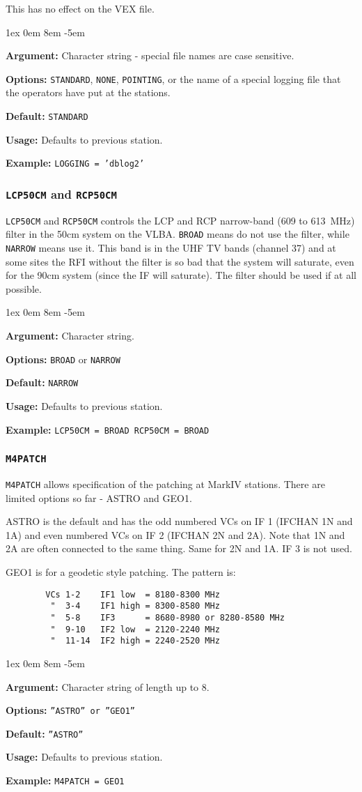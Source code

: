 \documentclass{report}
\newcommand{\rcwbox}[5]{
  \begin{list}{}{\parsep 1ex  \itemsep 0em
                 \leftmargin 8em  \itemindent -5em }
    \item {\bf Argument:} #1
    \item {\bf Options:}  #2
    \item {\bf Default:}  #3
    \item {\bf Usage:}    #4
    \item {\bf Example:}  #5
  \end{list}
}
\begin{document}
This has no effect on the VEX file.

\rcwbox
{Character string - special file names are case sensitive.}
{{\tt STANDARD}, {\tt NONE}, {\tt POINTING}, or the name of a special
logging file that the operators have put at the stations.}
{{\tt STANDARD}}
{Defaults to previous station.}
{{\tt LOGGING = 'dblog2'}}


\subsubsection{\label{SP:LCP50CM}{\tt LCP50CM} and {\tt RCP50CM}}

{\tt LCP50CM} and {\tt RCP50CM} controls the LCP and RCP narrow-band
(609 to 613~MHz) filter in the 50cm system on the VLBA. {\tt BROAD}
means do not use the filter, while {\tt NARROW} means use it. This
band is in the UHF TV bands (channel 37) and at some sites the RFI
without the filter is so bad that the system will saturate, even for
the 90cm system (since the IF will saturate). The filter should be
used if at all possible.

\rcwbox
{Character string.}
{{\tt BROAD} or {\tt NARROW}}
{{\tt NARROW}}
{Defaults to previous station.}
{{\tt LCP50CM = BROAD  RCP50CM = BROAD}}


\subsubsection{\label{SP:M4PATCH}{\tt M4PATCH}}

{\tt M4PATCH} allows specification of the patching at MarkIV stations.
There are limited options so far - ASTRO and GEO1.

ASTRO is the default and has the odd numbered VCs on IF 1 (IFCHAN 1N
and 1A) and even numbered VCs on IF 2 (IFCHAN 2N and 2A).  Note that
1N and 2A are often connected to the same thing.  Same for 2N and 1A.
IF 3 is not used.

GEO1 is for a geodetic style patching. The pattern is:
\begin{verbatim}
        VCs 1-2    IF1 low  = 8180-8300 MHz
         "  3-4    IF1 high = 8300-8580 MHz
         "  5-8    IF3      = 8680-8980 or 8280-8580 MHz
         "  9-10   IF2 low  = 2120-2240 MHz
         "  11-14  IF2 high = 2240-2520 MHz
\end{verbatim}

\rcwbox
{Character string of length up to 8.}
{{\tt ''ASTRO'' or ''GEO1''}}
{{\tt ''ASTRO''}}
{Defaults to previous station.}
{{\tt M4PATCH = GEO1}}
\end{document}
